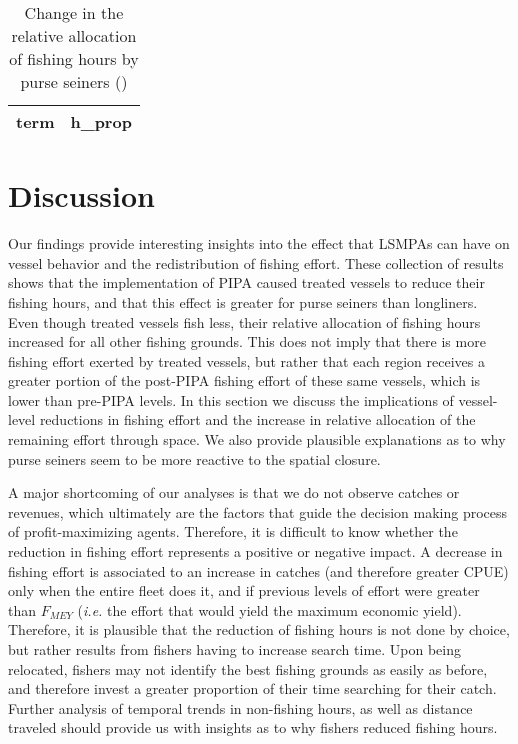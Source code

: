 \documentclass[11pt,]{article}
\begin{document}
\begin{table}[H]

\caption{\label{tab:unnamed-chunk-17}Change in the relative allocation of fishing hours by purse seiners ()}
\centering
\fontsize{7}{9}\selectfont
\begin{tabular}[t]{ll}
\toprule
term & h\_prop\\


\bottomrule
\end{tabular}
\end{table}

\clearpage

\hypertarget{discussion}{%
\section{Discussion}\label{discussion}}

Our findings provide interesting insights into the effect that LSMPAs
can have on vessel behavior and the redistribution of fishing effort.
These collection of results shows that the implementation of PIPA caused
treated vessels to reduce their fishing hours, and that this effect is
greater for purse seiners than longliners. Even though treated vessels
fish less, their relative allocation of fishing hours increased for all
other fishing grounds. This does not imply that there is more fishing
effort exerted by treated vessels, but rather that each region receives
a greater portion of the post-PIPA fishing effort of these same vessels,
which is lower than pre-PIPA levels. In this section we discuss the
implications of vessel-level reductions in fishing effort and the
increase in relative allocation of the remaining effort through space.
We also provide plausible explanations as to why purse seiners seem to
be more reactive to the spatial closure.

A major shortcoming of our analyses is that we do not observe catches or
revenues, which ultimately are the factors that guide the decision
making process of profit-maximizing agents. Therefore, it is difficult
to know whether the reduction in fishing effort represents a positive or
negative impact. A decrease in fishing effort is associated to an
increase in catches (and therefore greater CPUE) only when the entire
fleet does it, and if previous levels of effort were greater than
\(F_{MEY}\) (\emph{i.e.} the effort that would yield the maximum
economic yield). Therefore, it is plausible that the reduction of
fishing hours is not done by choice, but rather results from fishers
having to increase search time. Upon being relocated, fishers may not
identify the best fishing grounds as easily as before, and therefore
invest a greater proportion of their time searching for their catch.
Further analysis of temporal trends in non-fishing hours, as well as
distance traveled should provide us with insights as to why fishers
reduced fishing hours.
\end{document}
